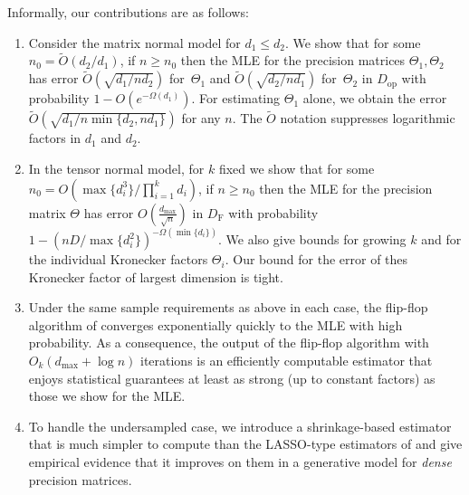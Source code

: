 \documentclass[aos]{imsart}
\theoremstyle{definition}
\numberwithin{equation}{section}
\newcommand{\eps}{\varepsilon}
\newcommand{\DF}{D_{\operatorname{F}}}
\newcommand{\Dop}{D_{\operatorname{op}}}
\newcommand{\DTV}{D_{\operatorname{TV}}}
\def\dmax{d_{\max}}
\newcommand{\CF}[1]{{\color{purple}[CF: #1]}}
\newcommand{\CF}[1]{{}}
\begin{document}
Informally, our contributions are as follows:
\begin{enumerate}
\item Consider the matrix normal model for $d_1 \leq d_2$. We show that for some $n_0 =\widetilde{O}( d_2/d_1)$, if $n \geq n_0$ then the MLE for the precision matrices $\Theta_1, \Theta_2$ has error $\widetilde{O}(\sqrt{{d_1}/{nd_2}})$ for~$\Theta_1$ and $\widetilde{O}(\sqrt{{d_2}/{nd_1}})$ for~$\Theta_2$ in $\Dop$ with probability $1 - O(e^{ - \Omega ( d_1)})$.
For estimating $\Theta_1$ alone, we obtain the error $\widetilde{O}(\sqrt{{d_1}/{n\min\{d_2, n d_1\}}})$ for any $n$. The $\widetilde{O}$ notation suppresses logarithmic factors in $d_1$ and $d_2$.
\item In the tensor normal model, for $k$ fixed we show that for some $n_0 = O( \max\{d_i^3\}/ \prod_{i=1}^k d_i)$, if $n \geq n_0$ then the MLE for the precision matrix $\Theta$ has error $O( \frac{\dmax}{\sqrt{n}} )$ in $\DF$ with probability $1 - (n D /\max\{d_i^2\})^{-\Omega(\min\{d_i\})}$.
We also give bounds for growing $k$ and for the individual Kronecker factors $\Theta_i$. Our bound for the error of thes Kronecker factor of largest dimension is tight.
\item Under the same sample requirements as above in each case, the flip-flop algorithm of \citep{mardia1993spatial,manceur2013maximum} converges exponentially quickly to the MLE with high probability.
As a consequence, the output of the flip-flop algorithm with $O_k\left(\dmax + \log n \right)$ iterations is an efficiently computable estimator that enjoys statistical guarantees at least as strong (up to constant factors) as those we show for the MLE.
\item To handle the undersampled case, we introduce a shrinkage-based estimator that is much simpler to compute than the LASSO-type estimators of \cite{tsiligkaridis2013convergence,sun2015nonconvex,zhou2014gemini} and give empirical evidence that it improves on them in a generative model for \emph{dense} precision matrices.
\end{enumerate}
\end{document}

